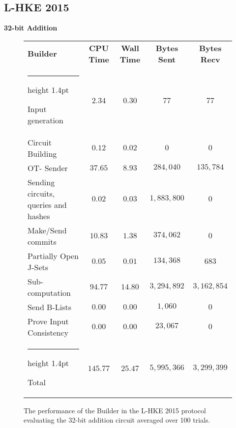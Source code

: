 \documentclass[11pt]{article} %
\makeatletter
\newcommand{\thickhline}{%
    \noalign {\ifnum 0=`}\fi \hrule height 1.4pt
    \futurelet \reserved@a \@xhline
}
\makeatother
\begin{document}
			\subsection{L-HKE 2015} \label{sub:L-HKE_Results_Analysis}
				\FloatBarrier
				\noindent \textbf{32-bit Addition}
				\begin{figure}[!ht]
					\begin{tabular}{| p{4.3cm} | c c c c |}
						\hline
						\textbf{Builder} & \textbf{CPU Time} & \textbf{Wall Time} & \textbf{Bytes Sent} & \textbf{Bytes Recv} \\
						\thickhline
						Input generation & $2.34$ & $0.30$ & $77$ & $77$ \\
						\hline
						Circuit Building & $0.12$ & $0.02$ & $0$ & $0$ \\
						\hline
						OT- Sender & $37.65$ & $8.93$ & $284,040$ & $135,784$ \\
						\hline
						Sending circuits, queries and hashes & $0.02$ & $0.03$ & $1,883,800$ & $0$ \\
						\hline
						Make/Send commits & $10.83$ & $1.38$ & $374,062$ & $0$ \\
						\hline
						Partially Open J-Sets & $0.05$ & $0.01$ & $134,368$ & $683$ \\
						\hline
						Sub-computation & $94.77$ & $14.80$ & $3,294,892$ & $3,162,854$ \\
						\hline
						Send B-Lists & $0.00$ & $0.00$ & $1,060$ & $0$ \\
						\hline
						Prove Input Consistency & $0.00$ & $0.00$ & $23,067$ & $0$ \\
						\thickhline
						Total & $145.77$ & $25.47$ & $5,995,366$ & $3,299,399$ \\
						\hline
					\end{tabular}
					\caption{The performance of the Builder in the L-HKE 2015 protocol evaluating the 32-bit addition circuit averaged over 100 trials. \label{table:L-HKE_2015_Add_Builder}}
				\end{figure}
\end{document}

